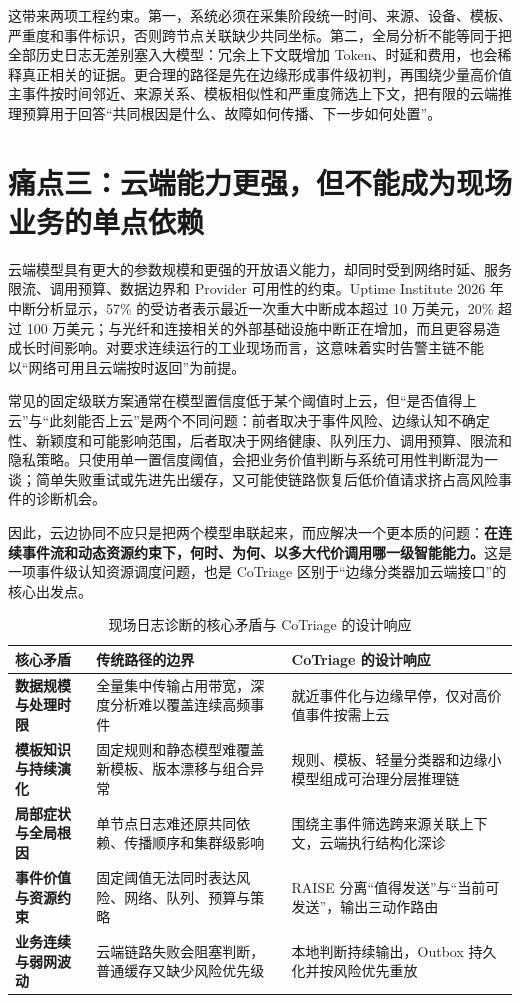 这带来两项工程约束。第一，系统必须在采集阶段统一时间、来源、设备、模板、严重度和事件标识，否则跨节点关联缺少共同坐标。第二，全局分析不能等同于把全部历史日志无差别塞入大模型：冗余上下文既增加 Token、时延和费用，也会稀释真正相关的证据。更合理的路径是先在边缘形成事件级初判，再围绕少量高价值主事件按时间邻近、来源关系、模板相似性和严重度筛选上下文，把有限的云端推理预算用于回答“共同根因是什么、故障如何传播、下一步如何处置”。

\section{痛点三：云端能力更强，但不能成为现场业务的单点依赖}

云端模型具有更大的参数规模和更强的开放语义能力，却同时受到网络时延、服务限流、调用预算、数据边界和 Provider 可用性的约束。Uptime Institute 2026 年中断分析显示，57\% 的受访者表示最近一次重大中断成本超过 10 万美元，20\% 超过 100 万美元；与光纤和连接相关的外部基础设施中断正在增加，而且更容易造成长时间影响\cite{uptime2026outage}。对要求连续运行的工业现场而言，这意味着实时告警主链不能以“网络可用且云端按时返回”为前提。

常见的固定级联方案通常在模型置信度低于某个阈值时上云，但“是否值得上云”与“此刻能否上云”是两个不同问题：前者取决于事件风险、边缘认知不确定性、新颖度和可能影响范围，后者取决于网络健康、队列压力、调用预算、限流和隐私策略。只使用单一置信度阈值，会把业务价值判断与系统可用性判断混为一谈；简单失败重试或先进先出缓存，又可能使链路恢复后低价值请求挤占高风险事件的诊断机会。

因此，云边协同不应只是把两个模型串联起来，而应解决一个更本质的问题：\textbf{在连续事件流和动态资源约束下，何时、为何、以多大代价调用哪一级智能能力。}这是一项事件级认知资源调度问题，也是 CoTriage 区别于“边缘分类器加云端接口”的核心出发点。

\begin{table}[htbp]
  \centering
  \footnotesize
  \renewcommand{\arraystretch}{0.96}
  \caption{现场日志诊断的核心矛盾与 CoTriage 的设计响应}
  \label{tab:problem-response}
  \begin{tabularx}{\textwidth}{>{\bfseries}p{} X X}
    \toprule
    核心矛盾 & 传统路径的边界 & CoTriage 的设计响应 \\
    \midrule
    数据规模与处理时限 & 全量集中传输占用带宽，深度分析难以覆盖连续高频事件 & 就近事件化与边缘早停，仅对高价值事件按需上云 \\
    模板知识与持续演化 & 固定规则和静态模型难覆盖新模板、版本漂移与组合异常 & 规则、模板、轻量分类器和边缘小模型组成可治理分层推理链 \\
    局部症状与全局根因 & 单节点日志难还原共同依赖、传播顺序和集群级影响 & 围绕主事件筛选跨来源关联上下文，云端执行结构化深诊 \\
    事件价值与资源约束 & 固定阈值无法同时表达风险、网络、队列、预算与策略 & RAISE 分离“值得发送”与“当前可发送”，输出三动作路由 \\
    业务连续与弱网波动 & 云端链路失败会阻塞判断，普通缓存又缺少风险优先级 & 本地判断持续输出，Outbox 持久化并按风险优先重放 \\
    \bottomrule
  \end{tabularx}
\end{table}

